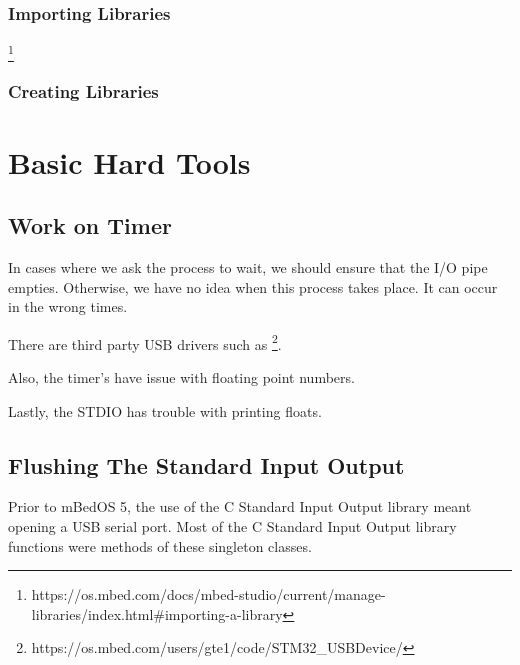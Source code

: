 \documentclass{article}
\begin{document}
\subsubsection{Importing Libraries} %
\label{ssub:importing_libraries}


\footnote{https://os.mbed.com/docs/mbed-studio/current/manage-libraries/index.html#importing-a-library}


\subsubsection{Creating Libraries} %
\label{ssub:creating_libraries}








\section{Basic Hard Tools} %
\label{sec:basic_hard_tools}

\subsection{Work on Timer} %
\label{sub:work_on_timer}

In cases where we ask the process to wait, we should ensure that the I/O pipe empties.  Otherwise, we have no idea when this process takes place.  It can occur in the wrong times.

There are third party USB drivers such as \footnote{https://os.mbed.com/users/gte1/code/STM32\_USBDevice/}.

Also, the timer's have issue with floating point numbers.

Lastly, the STDIO has trouble with printing floats.   


\subsection{Flushing The Standard Input Output} %
\label{sub:flushing_the_standard_input_output}
Prior to mBedOS 5, the use of the C Standard Input Output library meant opening a USB serial port.  Most of the C Standard Input Output library functions were methods of these singleton classes.  
\end{document}
